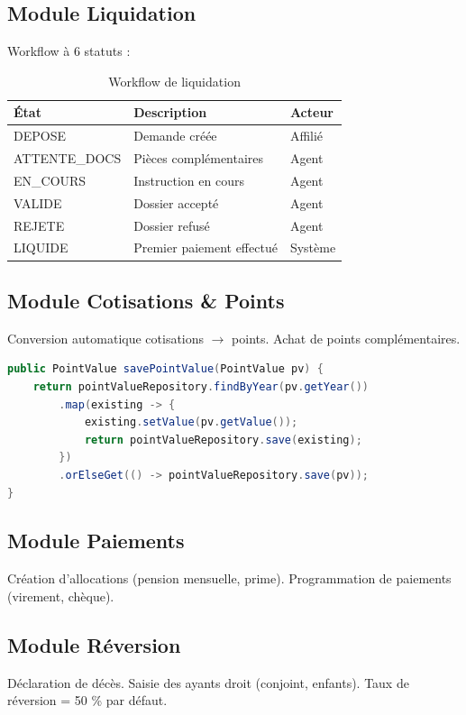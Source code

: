 \documentclass[12pt,a4paper,oneside]{report}
\begin{document}
\subsection{Module Liquidation}
Workflow à 6 statuts :
\begin{table}[H]
\centering
\caption{Workflow de liquidation}
\begin{tabular}{lll}
\toprule
\textbf{État} & \textbf{Description} & \textbf{Acteur} \\
\midrule
DEPOSE & Demande créée & Affilié \\
ATTENTE\_DOCS & Pièces complémentaires & Agent \\
EN\_COURS & Instruction en cours & Agent \\
VALIDE & Dossier accepté & Agent \\
REJETE & Dossier refusé & Agent \\
LIQUIDE & Premier paiement effectué & Système \\
\bottomrule
\end{tabular}
\end{table}

\subsection{Module Cotisations \& Points}
Conversion automatique cotisations $\rightarrow$ points. Achat de points complémentaires.

\begin{lstlisting}[language=Java,caption={Upsert intelligent des valeurs de point}]
public PointValue savePointValue(PointValue pv) {
    return pointValueRepository.findByYear(pv.getYear())
        .map(existing -> {
            existing.setValue(pv.getValue());
            return pointValueRepository.save(existing);
        })
        .orElseGet(() -> pointValueRepository.save(pv));
}
\end{lstlisting}

\subsection{Module Paiements}
Création d'allocations (pension mensuelle, prime). Programmation de paiements (virement, chèque).

\subsection{Module Réversion}
Déclaration de décès. Saisie des ayants droit (conjoint, enfants). Taux de réversion = 50 \% par défaut.
\end{document}
